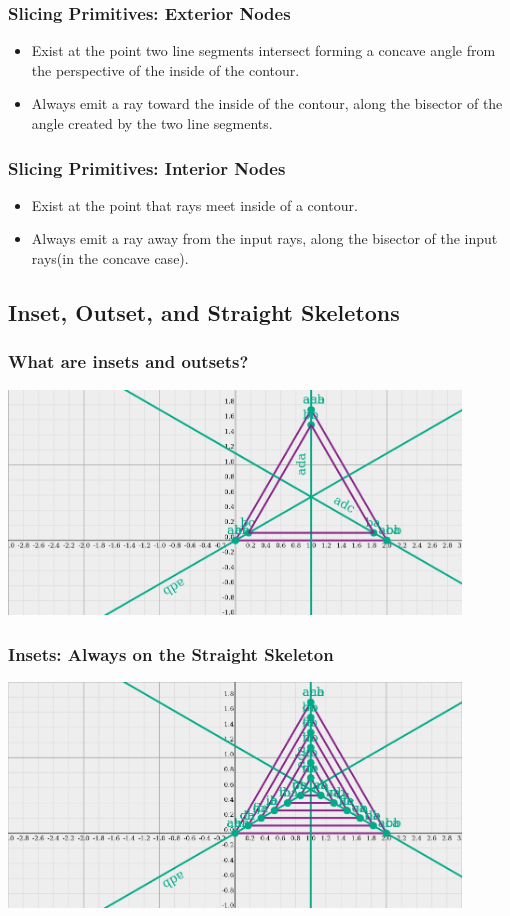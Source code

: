 \documentclass[hyperref={pdfpagemode=FullScreen},aspectratio=169]{beamer}
\begin{document}
\begin{frame}
  \frametitle{Slicing Primitives: Exterior Nodes}
  \begin{itemize}
  \item Exist at the point two line segments intersect forming a concave angle from the perspective of the inside of the contour.
  \item Always emit a ray toward the inside of the contour, along the bisector of the angle created by the two line segments.
  \end{itemize}
\end{frame}

\begin{frame}
  \frametitle{Slicing Primitives: Interior Nodes}
  \begin{itemize}
  \item Exist at the point that rays meet inside of a contour.
  \item Always emit a ray away from the input rays, along the bisector of the input rays(in the concave case).
  \end{itemize}
\end{frame}

\subsection{Inset, Outset, and Straight Skeletons}

\begin{frame}
  \frametitle{What are insets and outsets?}
  \includegraphics[width=0.9\textwidth, center]{triangle-one_inset.png}
\end{frame}

\begin{frame}
  \frametitle{Insets: Always on the Straight Skeleton}
    \includegraphics[width=0.9\textwidth, center]{triangle-all_insets.png}
\end{frame}
\end{document}
